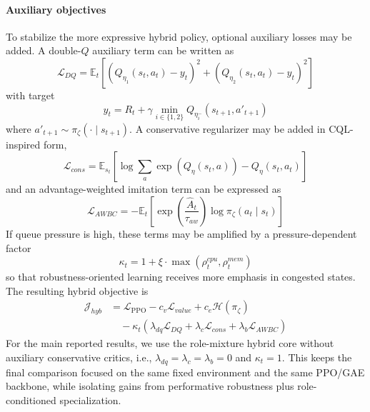 \documentclass[journal]{IEEEtran}
\begin{document}
\paragraph{Auxiliary objectives}
To stabilize the more expressive hybrid policy, optional auxiliary losses may be added. A double-$Q$ auxiliary term can be written as
\begin{equation}
\mathcal{L}_{DQ} = \mathbb{E}_t\left[
\left(Q_{\eta_1}(s_t,a_t) - y_t\right)^2 +
\left(Q_{\eta_2}(s_t,a_t) - y_t\right)^2
\right]
\end{equation}
with target
\begin{equation}
y_t = R_t + \gamma \min_{i\in\{1,2\}} Q_{\eta_i^-}(s_{t+1}, a'_{t+1})
\end{equation}
where $a'_{t+1}\sim\pi_\zeta(\cdot\mid s_{t+1})$. A conservative regularizer may be added in CQL-inspired form,
\begin{equation}
\mathcal{L}_{cons}
=
\mathbb{E}_{s_t}\left[\log \sum_a \exp(Q_\eta(s_t,a)) - Q_\eta(s_t,a_t)\right]
\end{equation}
and an advantage-weighted imitation term can be expressed as
\begin{equation}
\mathcal{L}_{AWBC}
=
-\mathbb{E}_t\left[\exp\left(\frac{\hat{A}_t}{\tau_{aw}}\right)\log \pi_\zeta(a_t\mid s_t)\right]
\end{equation}
If queue pressure is high, these terms may be amplified by a pressure-dependent factor
\begin{equation}
\kappa_t = 1 + \xi \cdot \max(\rho_t^{cpu}, \rho_t^{mem})
\end{equation}
so that robustness-oriented learning receives more emphasis in congested states. The resulting hybrid objective is
\begin{equation}
\begin{aligned}
\mathcal{J}_{hyb}
&=
\mathcal{L}_{\text{PPO}}
- c_v \mathcal{L}_{value}
+ c_e \mathcal{H}(\pi_\zeta) \\
&\quad
- \kappa_t\!\left(
\lambda_{dq}\mathcal{L}_{DQ}
+ \lambda_c \mathcal{L}_{cons}
+ \lambda_b \mathcal{L}_{AWBC}
\right)
\end{aligned}
\end{equation}
For the main reported results, we use the role-mixture hybrid core without auxiliary conservative critics, i.e., $\lambda_{dq}=\lambda_c=\lambda_b=0$ and $\kappa_t=1$. This keeps the final comparison focused on the same fixed environment and the same PPO/GAE backbone, while isolating gains from performative robustness plus role-conditioned specialization.
\end{document}
